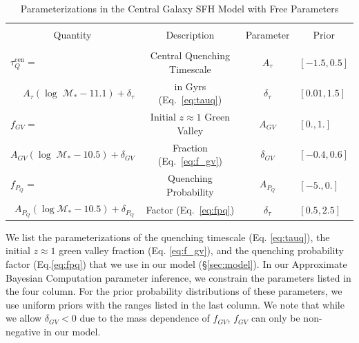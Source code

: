 \begin{table}
\caption{Parameterizations in the Central Galaxy SFH Model with Free Parameters}
\begin{center}
\begin{tabular}{cccc} \toprule
\multicolumn{4}{c}{} \\[-7pt]
\multicolumn{1}{c}{Quantity}  &
\multicolumn{1}{c}{Description} & \multicolumn{1}{c}{Parameter} &
\multicolumn{1}{c}{Prior} \\
\hline
\multicolumn{4}{c}{} \\[-5pt]
\multicolumn{1}{l}{$\tau_Q^\mathrm{cen}=$} & 
\multicolumn{1}{c}{Central Quenching Timescale} & 
\multicolumn{1}{c}{$A_\tau$} & 
\multicolumn{1}{l}{$[-1.5, 0.5]$} \\
\multicolumn{1}{r}{$A_\tau (\log\;\mathcal{M}_* - 11.1) + \delta_\tau$} & 
\multicolumn{1}{c}{in Gyrs (Eq.~\ref{eq:tauq})} & 
\multicolumn{1}{c}{$\delta_\tau$} & 
\multicolumn{1}{l}{$[0.01, 1.5]$} \\[3pt]
\multicolumn{1}{l}{$f_{GV} = $} & 
\multicolumn{1}{c}{Initial $z \approx 1$ Green Valley} & 
\multicolumn{1}{c}{$A_{GV}$} & 
\multicolumn{1}{l}{$[0., 1.]$} \\
\multicolumn{1}{r}{$A_{GV} (\log\;\mathcal{M}_* - 10.5) + \delta_{GV}$} & 
\multicolumn{1}{c}{Fraction (Eq.~\ref{eq:f_gv})} & 
\multicolumn{1}{c}{$\delta_{GV}$} & 
\multicolumn{1}{l}{$[-0.4, 0.6]$} \\[3pt]
\multicolumn{1}{l}{$f_{P_Q}=$} & 
\multicolumn{1}{c}{Quenching Probability} & 
\multicolumn{1}{c}{$A_{P_Q}$} & 
\multicolumn{1}{l}{$[-5., 0.]$} \\
\multicolumn{1}{r}{$A_{P_Q} (\log\mathcal{M}_* - 10.5) + \delta_{P_Q}$} & 
\multicolumn{1}{c}{Factor (Eq.~\ref{eq:fpq})} & 
\multicolumn{1}{c}{$\delta_\tau$} & 
\multicolumn{1}{l}{$[0.5, 2.5]$} \\[3pt]
\hline
\end{tabular} \label{tab:free_params}
\end{center}
We list the parameterizations of the quenching timescale (Eq. \ref{eq:tauq}), 
the initial $z \approx 1$ green valley fraction (Eq. \ref{eq:f_gv}), 
and the quenching probability factor (Eq.\ref{eq:fpq}) that we use in our 
model (\S\ref{sec:model}). In our Approximate Bayesian Computation 
parameter inference, we constrain the parameters listed in the four 
column. For the prior probability distributions of
these parameters, we use uniform priors with the ranges listed in the 
last column. We note that while we allow $\delta_{GV} < 0$ due to the mass 
dependence of $f_{GV}$, $f_{GV}$ can only be non-negative in our model.
\bigskip
\end{table}

